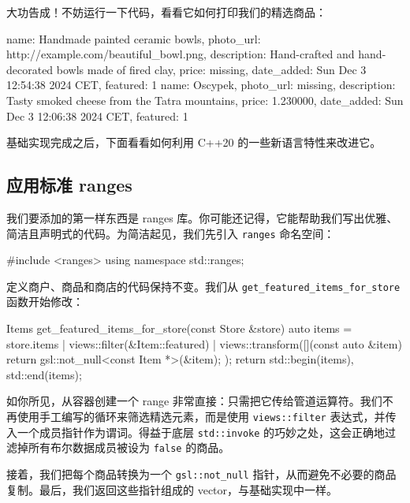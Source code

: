 大功告成！不妨运行一下代码，看看它如何打印我们的精选商品：

\begin{codebox}[text]
name: Handmade painted ceramic bowls, photo_url: http://example.com/beautiful_bowl.png, description: Hand-crafted and hand-decorated bowls made of fired clay, price: missing, date_added: Sun Dec  3 12:54:38 2024 CET, featured: 1
name: Oscypek, photo_url: missing, description: Tasty smoked cheese from the Tatra mountains, price: 1.230000, date_added: Sun Dec  3 12:06:38 2024 CET, featured: 1
\end{codebox}

\label{idx:494}
\label{idx:495}
基础实现完成之后，下面看看如何利用 C++20 的一些新语言特性来改进它。

\subsection{应用标准 ranges}

\label{idx:496}
我们要添加的第一样东西是 ranges 库。你可能还记得，它能帮助我们写出优雅、简洁且声明式的代码。为简洁起见，我们先引入 \texttt{ranges} 命名空间：

\begin{codebox}[cpp]
#include <ranges>
using namespace std::ranges;
\end{codebox}

定义商户、商品和商店的代码保持不变。我们从 \texttt{get\_\allowbreak{}featured\_\allowbreak{}items\_\allowbreak{}for\_\allowbreak{}store} 函数开始修改：

\begin{codebox}[cpp]
Items get_featured_items_for_store(const Store &store) {
    auto items = store.items
                | views::filter(&Item::featured)
                | views::transform([](const auto &item) {
                    return gsl::not_null<const Item *>(&item);
                });
    return {std::begin(items), std::end(items)};
}
\end{codebox}

\label{idx:497}
如你所见，从容器创建一个 range 非常直接：只需把它传给管道运算符。我们不再使用手工编写的循环来筛选精选元素，而是使用 \texttt{views::\allowbreak{}filter} 表达式，并传入一个成员指针作为谓词。得益于底层 \texttt{std::\allowbreak{}invoke} 的巧妙之处，这会正确地过滤掉所有布尔数据成员被设为 \texttt{false} 的商品。

接着，我们把每个商品转换为一个 \texttt{gsl::\allowbreak{}not\_\allowbreak{}null} 指针，从而避免不必要的商品复制。最后，我们返回这些指针组成的 vector，与基础实现中一样。

